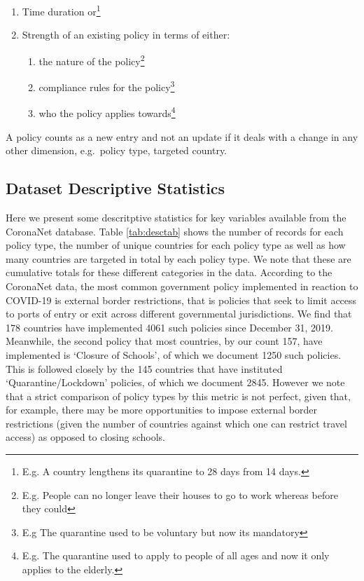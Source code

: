 \documentclass[]{article}
\providecommand{\tightlist}{%
  \setlength{\itemsep}{0pt}\setlength{\parskip}{0pt}}
\let\rmarkdownfootnote\footnote%
\def\footnote{\protect\rmarkdownfootnote}
\begin{document}
\begin{enumerate}
\def\labelenumi{\arabic{enumi}.}
\tightlist
\item
  Time duration or\footnote{E.g. A country lengthens its quarantine to 28 days from 14 days.}
\item
  Strength of an existing policy in terms of either:

  \begin{enumerate}
  \def\labelenumii{\alph{enumii}.}
  \tightlist
  \item
    the nature of the policy\footnote{E.g. People can no longer leave their houses to go to work whereas before they could}
  \item
    compliance rules for the policy\footnote{E.g The quarantine used to be voluntary but now its mandatory}
  \item
    who the policy applies towards\footnote{E.g. The quarantine used to apply to people of all ages and now it only applies to the elderly.}
  \end{enumerate}
\end{enumerate}

A policy counts as a new entry and not an update if it deals with a change in any other dimension, e.g.~policy type, targeted country.

\hypertarget{dataset-descriptive-statistics}{%
\subsection{Dataset Descriptive Statistics}\label{dataset-descriptive-statistics}}

Here we present some descritptive statistics for key variables available from the CoronaNet database. Table \ref{tab:desctab} shows the number of records for each policy type, the number of unique countries for each policy type as well as how many countries are targeted in total by each policy type. We note that these are cumulative totals for these different categories in the data. According to the CoronaNet data, the most common government policy implemented in reaction to COVID-19 is external border restrictions, that is policies that seek to limit access to ports of entry or exit across different governmental jurisdictions. We find that 178 countries have implemented 4061 such policies since December 31, 2019. Meanwhile, the second policy that most countries, by our count 157, have implemented is `Closure of Schools', of which we document 1250 such policies. This is followed closely by the 145 countries that have instituted `Quarantine/Lockdown' policies, of which we document 2845. However we note that a strict comparison of policy types by this metric is not perfect, given that, for example, there may be more opportunities to impose external border restrictions (given the number of countries against which one can restrict travel access) as opposed to closing schools.
\end{document}
